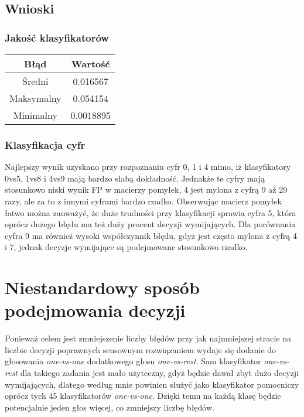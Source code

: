 \documentclass[12pt,a4paper,notitlepage]{article}
\begin{document}
\subsection{Wnioski}
\subsubsection{Jakość klasyfikatorów}
\begin{center}
\begin{tabular}{|c|c|}\hline
Błąd & Wartość \\\hline
Średni & 0.016567	\\\hline
Maksymalny & 0.054154	 \\\hline
Minimalny & 0.0018895	\\\hline
\end{tabular}
\end{center}

\subsubsection{Klasyfikacja cyfr}
Najlepszy wynik uzyskano przy rozpoznaniu cyfr 0, 1 i 4 mimo, iż klasyfikatory 0vs5, 1vs8 i 4vs9 mają bardzo słabą dokładność. Jednakże te cyfry mają stosunkowo niski wynik FP w macierzy pomyłek, 4 jest mylona z cyfrą 9 aż 29 razy, ale za to z innymi cyframi bardzo rzadko. Obserwując macierz pomyłek łatwo można zauważyć, że duże trudności przy klasyfikacji sprawia cyfra 5, która oprócz dużego błędu ma też duży procent decyzji wymijających. Dla porównania cyfra 9 ma również wysoki współczynnik błędu, gdyż jest często mylona z cyfrą 4 i 7, jednak decyzje wymijające są podejmowane stosunkowo rzadko. 


\section{Niestandardowy sposób podejmowania decyzji}
Ponieważ celem jest zmniejszenie liczby błędów przy jak najmniejszej stracie na liczbie decyzji poprawnych sensownym rozwiązaniem wydaje się dodanie do głosowania \textit{one-vs-one} dodatkowego głosu \textit{one-vs-rest}. Sam klasyfikator \textit{one-vs-rest} dla takiego zadania jest mało użyteczny, gdyż będzie dawał zbyt dużo decyzji wymijających, dlatego według mnie powinien służyć jako klasyfikator pomocniczy oprócz tych 45 klasyfikatorów \textit{one-vs-one}. Dzięki temu na każdą klasę będzie potencjalnie jeden głos więcej, co zmniejszy liczbę błędów. 
\end{document}
